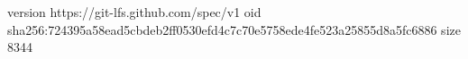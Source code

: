 version https://git-lfs.github.com/spec/v1
oid sha256:724395a58ead5cbdeb2ff0530efd4c7c70e5758ede4fe523a25855d8a5fc6886
size 8344
